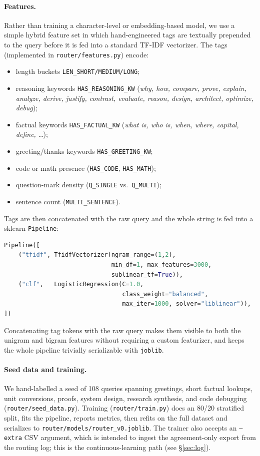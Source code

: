 \documentclass{article}
\begin{document}
\paragraph{Features.} Rather than training a character-level or embedding-based
model, we use a simple hybrid feature set in which hand-engineered tags are
textually prepended to the query before it is fed into a standard TF-IDF
vectorizer. The tags (implemented in \texttt{router/features.py}) encode:
\begin{itemize}
    \item length buckets \texttt{LEN\_SHORT/MEDIUM/LONG};
    \item reasoning keywords \texttt{HAS\_REASONING\_KW} (\emph{why, how, compare,
    prove, explain, analyze, derive, justify, contrast, evaluate, reason, design,
    architect, optimize, debug});
    \item factual keywords \texttt{HAS\_FACTUAL\_KW} (\emph{what is, who is,
    when, where, capital, define, \ldots});
    \item greeting/thanks keywords \texttt{HAS\_GREETING\_KW};
    \item code or math presence (\texttt{HAS\_CODE}, \texttt{HAS\_MATH});
    \item question-mark density (\texttt{Q\_SINGLE} vs.\ \texttt{Q\_MULTI});
    \item sentence count (\texttt{MULTI\_SENTENCE}).
\end{itemize}
Tags are then concatenated with the raw query and the whole string is fed
into a sklearn \texttt{Pipeline}:
\begin{lstlisting}[language=Python]
Pipeline([
    ("tfidf", TfidfVectorizer(ngram_range=(1,2),
                              min_df=1, max_features=3000,
                              sublinear_tf=True)),
    ("clf",   LogisticRegression(C=1.0,
                                 class_weight="balanced",
                                 max_iter=1000, solver="liblinear")),
])
\end{lstlisting}
Concatenating tag tokens with the raw query makes them visible to both the
unigram and bigram features without requiring a custom featurizer, and keeps
the whole pipeline trivially serializable with \texttt{joblib}.

\paragraph{Seed data and training.} We hand-labelled a seed of 108 queries
spanning greetings, short factual lookups, unit conversions,
proofs, system design, research synthesis, and code debugging
(\texttt{router/seed\_data.py}). Training (\texttt{router/train.py}) does an
80/20 stratified split, fits the pipeline, reports metrics, then refits on
the full dataset and serializes to
\texttt{router/models/router\_v0.joblib}. The trainer also accepts an
\texttt{--extra} CSV argument, which is intended to ingest the
agreement-only export from the routing log; this is the continuous-learning
path (see \S\ref{sec:log}).
\end{document}
